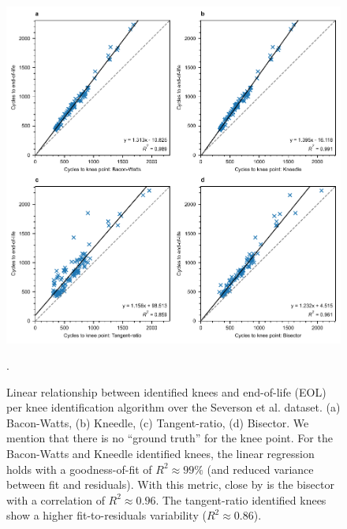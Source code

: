 \documentclass[journal=jpclcd,manuscript=article]{achemso}
\begin{document}
\begin{figure}[ht]
\centering
\includegraphics[scale=1.0]{final_figures/severson_knee_eol_all_algorithms.pdf}
\caption{Linear relationship between identified knees and end-of-life (EOL) per knee identification algorithm over the Severson et al. \cite{severson_data-driven_2019} dataset.
(a) Bacon-Watts\cite{fermin-cueto_identification_2020}{},
(b) Kneedle\cite{satopaa_finding_2011}{},
(c) Tangent-ratio\cite{diao_algorithm_2019}{},
(d) Bisector\cite{greenbank_automated_2021}{}.
We mention that there is no ``ground truth'' for the knee point. For the Bacon-Watts and Kneedle identified knees, the linear regression holds with a goodness-of-fit of $R^2\approx 99\%$ (and reduced variance between fit and residuals). With this metric, close by is the bisector\cite{greenbank_automated_2021} with a correlation of $R^2\approx 0.96$. The tangent-ratio\cite{diao_algorithm_2019} identified knees show a higher fit-to-residuals variability ($R^2\approx 0.86$).}.
\label{fig:severson_knee_eol_all_algorithms}
\end{figure}
\end{document}
